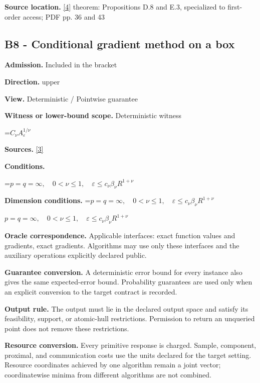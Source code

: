 \documentclass[10pt,a4paper]{article}
\newcommand{\AtlasMath}[1]{\par\begingroup\centering\setbox0=\hbox{$\displaystyle #1$}\ifdim\wd0>1.4\linewidth\typeout{ATLAS WIDE FORMULA: \the\wd0}\fi\ifdim\wd0>\linewidth\resizebox{\linewidth}{!}{\box0}\else\box0\fi\par\endgroup}
\newcommand{\AtlasInlineMath}[1]{\begingroup\setbox0=\hbox{$#1$}\ifdim\wd0>.4\linewidth\endgroup\AtlasMath{#1}\else\endgroup$#1$\fi}
\begin{document}
\textbf{Source location.} \href{https://arxiv.org/pdf/2609.32910}{[4]} theorem: Propositions D.8 and E.3, specialized to first-order access; PDF pp. 36 and 43



\subsection{B8 - Conditional gradient method on a box}


\textbf{Admission.} Included in the bracket



\textbf{Direction.} upper



\textbf{View.} Deterministic / Pointwise guarantee



\textbf{Witness or lower-bound scope.} Deterministic witness



\AtlasMath{C_\nu A_\varepsilon^{1/\nu}}


\textbf{Sources.} \href{https://arxiv.org/pdf/1307.5001}{[3]}



\textbf{Conditions.}
\AtlasMath{p=q=\infty,\quad0<\nu\le1,\quad\varepsilon\le c_\nu\beta_\nu R^{1+\nu}}




\textbf{Dimension conditions.} \AtlasInlineMath{p=q=\infty,\quad0<\nu\le1,\quad\varepsilon\le c_\nu\beta_\nu R^{1+\nu}}



\textbf{Oracle correspondence.} Applicable interfaces: exact function values and gradients, exact gradients. Algorithms may use only these interfaces and the auxiliary operations explicitly declared public.



\textbf{Guarantee conversion.} A deterministic error bound for every instance also gives the same expected-error bound. Probability guarantees are used only when an explicit conversion to the target contract is recorded.



\textbf{Output rule.} The output must lie in the declared output space and satisfy its feasibility, support, or atomic-hull restrictions. Permission to return an unqueried point does not remove these restrictions.



\textbf{Resource conversion.} Every primitive response is charged. Sample, component, proximal, and communication costs use the units declared for the target setting. Resource coordinates achieved by one algorithm remain a joint vector; coordinatewise minima from different algorithms are not combined.
\end{document}
